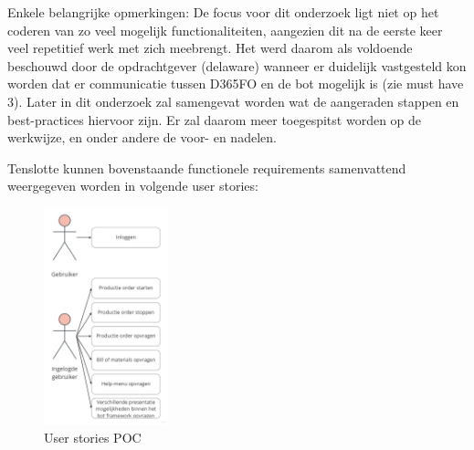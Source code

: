 Enkele belangrijke opmerkingen:
De focus voor dit onderzoek ligt niet op het coderen van zo veel mogelijk functionaliteiten, aangezien dit na de eerste keer veel repetitief werk met zich meebrengt. Het werd daarom als voldoende beschouwd door de opdrachtgever (delaware) wanneer er duidelijk vastgesteld kon worden dat er communicatie tussen D365FO en de bot mogelijk is (zie must have 3). Later in dit onderzoek zal samengevat worden wat de aangeraden stappen en best-practices hiervoor zijn.  Er zal daarom meer toegespitst worden op de werkwijze, en onder andere de voor- en nadelen. 

Tenslotte kunnen bovenstaande functionele requirements samenvattend weergegeven worden in volgende user stories: 

\begin{figure}[h]
    \centering
    \includegraphics[width=0.32\textwidth]{img/UserStories.jpg}
    \caption{User stories POC }
\end{figure}


 
